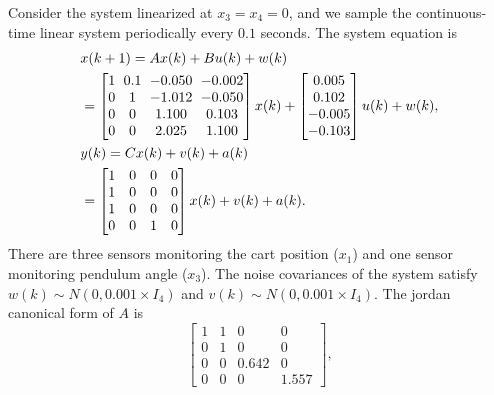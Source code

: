 \documentclass{ieeetrans}   %
\begin{document}
Consider the system linearized at $x_3=x_4=0$, and we sample the continuous-time linear system periodically every $0.1$ seconds. The system equation is 
\begin{align*}
	&x(k+1)=Ax(k)+Bu(k)+w(k) \\
	&=
	\begin{bmatrix}
	1&  \hspace{-4pt} 0.1  & \hspace{-4pt} -0.050  &\hspace{-4pt}  -0.002\\
	0 &  \hspace{-4pt} 1   & \hspace{-4pt}-1.012  &  \hspace{-4pt} -0.050\\
	0  &  \hspace{-4pt} 0 & \hspace{-4pt}  1.100 &  \hspace{-4pt} 0.103\\
	0   &  \hspace{-4pt} 0& \hspace{-4pt} 2.025  & \hspace{-4pt} 1.100
	\end{bmatrix}x(k)+
\begin{bmatrix}
	0.005\\
	0.102\\
	-0.005\\
	-0.103
\end{bmatrix}
u(k)+w(k),\\
%
&y(k)=Cx(k)+v(k)+a(k)\\
&=
\begin{bmatrix}
	1& 0 &0 &0\\
	1& 0 &0 &0\\
	1& 0 &0 &0\\
	0& 0 &1 &0
\end{bmatrix}x(k)+v(k)+a(k).
\end{align*}
There are three sensors monitoring the cart position ($x_1$) and one sensor monitoring pendulum angle ($x_3$).
The noise covariances of the system satisfy $w(k) \sim {N}(0, 0.001\times I_4)$ and $v(k) \sim {N}(0, 0.001\times I_4)$.
The jordan canonical form of $A$ is 
$$
\begin{bmatrix}
	1  & 1 &  0 & 0\\
	0  & 1 & 0 &  0\\
	0  & 0 & 0.642 & 0  \\
	0  & 0 & 0 &  1.557 
\end{bmatrix},
$$
\end{document}
